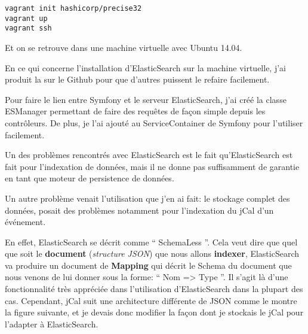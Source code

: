 \begin{lstlisting}
vagrant init hashicorp/precise32
vagrant up
vagrant ssh
\end{lstlisting}

Et on se retrouve dans une machine virtuelle avec Ubuntu 14.04.

En ce qui concerne l'installation d'ElasticSearch sur la machine virtuelle, j'ai produit la  sur le Github pour que d'autres puissent le refaire facilement.

Pour faire le lien entre Symfony et le serveur ElasticSearch, j'ai créé la classe ESManager permettant de faire des requêtes de façon simple depuis les contrôleurs. De plus, je l'ai ajouté au ServiceContainer de Symfony pour l'utiliser facilement.

Un des problèmes rencontrés avec ElasticSearch est le fait qu'ElasticSearch est fait pour l'indexation de données, mais il ne donne pas suffisamment de garantie en tant que moteur de persistence de données.

Un autre problème venait l'utilisation que j'en ai fait: le stockage complet des données, posait des problèmes notamment pour l'indexation du jCal d'un événement.

En effet, ElasticSearch se décrit comme `` SchemaLess ''. Cela veut dire que quel que soit le \textbf{document} (\textit{structure JSON}) que nous allons \textbf{indexer}, ElasticSearch va produire un document de \textbf{Mapping} qui décrit le Schema du document que nous venons de lui donner sous la forme: `` Nom => Type ''. Il s'agit là d'une fonctionnalité très appréciée dans l'utilisation d'ElasticSearch dans la plupart des cas. Cependant, jCal suit une architecture différente de JSON comme le montre la figure suivante, et je devais donc modifier la façon dont je stockais le jCal pour l'adapter à ElasticSearch.

